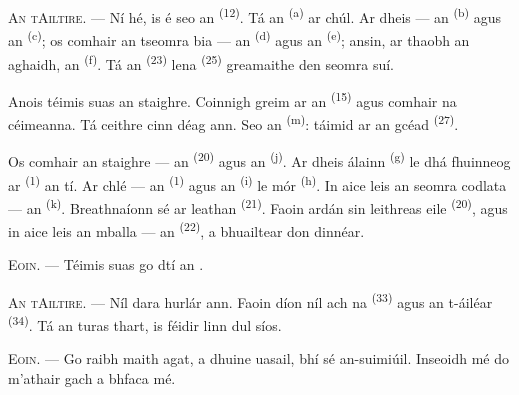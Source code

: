\textsc{An tAiltire}. --- Ní hé, is é seo an 
\textsuperscript{(12)}. Tá an  \textsuperscript{(a)} ar chúl. Ar
dheis --- an  \textsuperscript{(b)} agus an  \textsuperscript{(c)}; os comhair an tseomra bia --- an 
\textsuperscript{(d)} agus an  \textsuperscript{(e)}; ansin, ar
thaobh an aghaidh, an  \textsuperscript{(f)}. Tá an
 \textsuperscript{(23)} lena 
\textsuperscript{(25)} greamaithe den seomra suí.

Anois téimis suas an staighre. Coinnigh greim ar an 
\textsuperscript{(15)} agus comhair na céimeanna. Tá ceithre cinn déag ann. Seo an
 \textsuperscript{(m)}: táimid ar an gcéad 
\textsuperscript{(27)}.

\VUsaut{3.0mm}
\VUsaut{3.0mm}

Os comhair an staighre --- an  \textsuperscript{(20)} agus an
 \textsuperscript{(j)}. Ar dheis  álainn \textsuperscript{(g)} le dhá fhuinneog ar 
\textsuperscript{(1)} an tí. Ar chlé --- an 
\textsuperscript{(1)} agus an  \textsuperscript{(i)} le
 mór \textsuperscript{(h)}. In aice leis an seomra codlata --- an
 \textsuperscript{(k)}. Breathnaíonn sé ar 
leathan \textsuperscript{(21)}. Faoin ardán sin leithreas eile
\textsuperscript{(20)}, agus in aice leis an mballa --- an 
\textsuperscript{(22)}, a bhuailtear don dinnéar.

\textsc{Eoin}. --- Téimis suas go dtí an .

\textsc{An tAiltire}. --- Níl dara hurlár ann. Faoin díon níl ach na
 \textsuperscript{(33)} agus an t-áiléar
\textsuperscript{(34)}. Tá an turas thart, is féidir linn dul síos.

\textsc{Eoin}. --- Go raibh maith agat, a dhuine uasail, bhí sé an-suimiúil.
Inseoidh mé do m'athair gach a bhfaca mé.
\VUsaut{4.0mm}
\VUfilet{22mm}
